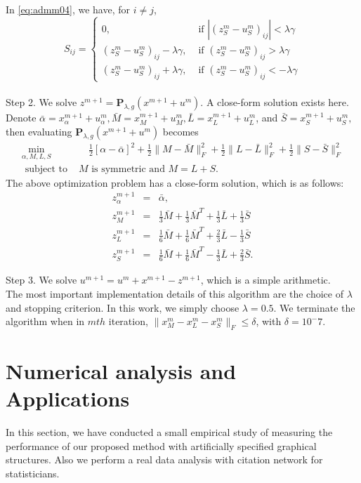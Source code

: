 \documentclass{article}
\begin{document}
In \eqref{eq:admm04}, we have, for $i \neq j$,
\[
S_{ij} = \left\{
\begin{array}{ll}
0, & \mbox{ if } |(z^m_S - u^m_S)_{ij}| < \lambda \gamma  \\
(z^m_S - u^m_S)_{ij}-\lambda\gamma , &
\mbox{ if } (z^m_S - u^m_S)_{ij} > \lambda \gamma \\
(z^m_S - u^m_S)_{ij}+\lambda\gamma , &
\mbox{ if } (z^m_S - u^m_S)_{ij} <- \lambda \gamma
\end{array}
\right.
\]
\\

\noindent
Step 2. We solve $z^{m+1} = \mathbf{P}_{\lambda,g}(x^{m+1} + u^m)$.
A close-form solution exists here.
Denote
$
\bar{\alpha} = x^{m+1}_\alpha + u^m_\alpha,
\bar{M} = x^{m+1}_M + u^m_M,
\bar{L} = x^{m+1}_L + u^m_L$, and
$\bar{S} = x^{m+1}_S + u^m_S,
$
then evaluating $\mathbf{P}_{\lambda,g}(x^{m+1} + u^m)$ becomes
\begin{eqnarray*}
\min_{\alpha,M,L,S} & \quad
\frac{1}{2}[\alpha - \bar{\alpha}]^2
+ \frac{1}{2}\|M - \bar{M}\|^2_F
+ \frac{1}{2}\|L - \bar{L}\|^2_F
+ \frac{1}{2}\|S - \bar{S}\|^2_F  \\
\mbox{ subject to } & M \mbox{ is symmetric and } M=L+S.
\end{eqnarray*}
The above optimization problem has a close-form solution, which is as follows:
\begin{eqnarray*}
z^{m+1}_\alpha &=& \bar{\alpha}, \\
z^{m+1}_M &=&
\frac{1}{3} \bar{M} + \frac{1}{3} \bar{M}^T + \frac{1}{3} \bar{L} + \frac{1}{3} \bar{S} \\
z^{m+1}_L &=&
\frac{1}{6} \bar{M} + \frac{1}{6} \bar{M}^T + \frac{2}{3} \bar{L} - \frac{1}{3} \bar{S} \\
z^{m+1}_S &=&
\frac{1}{6} \bar{M} + \frac{1}{6} \bar{M}^T - \frac{1}{3} \bar{L} + \frac{2}{3} \bar{S}.
\end{eqnarray*}

\noindent
Step 3. We solve $u^{m+1} = u^m + x^{m+1} - z^{m+1}$, which is a simple arithmetic. \\

The most important implementation details of this algorithm are the choice of $\lambda$ and stopping criterion. In this work, we simply choose $\lambda = 0.5$. We terminate the algorithm  when in $mth$ iteration, $\|x^{m}_M - x^{m}_L - x^{m}_S\|_F \leq \delta$, with $\delta=10^-7$.

\section{ Numerical analysis and Applications}
In this section, we have conducted a small empirical study of measuring the performance of our proposed method with artificially specified graphical structures. Also we perform a real data analysis with citation network for statisticians.
\end{document}
